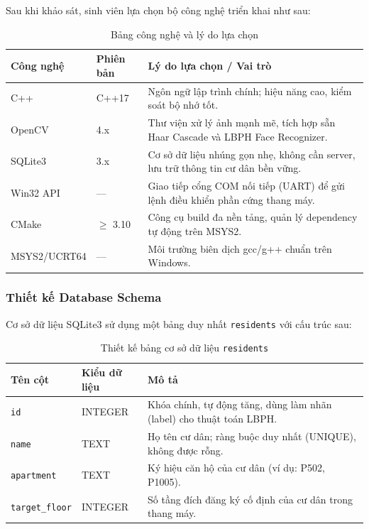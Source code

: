 \documentclass[12pt,a4paper]{article}
\begin{document}
Sau khi khảo sát, sinh viên lựa chọn bộ công nghệ triển khai như sau:

\begin{table}[h!]
\centering
\caption{Bảng công nghệ và lý do lựa chọn}
\renewcommand{\arraystretch}{1.3}
\begin{tabular}{|m{3cm}|m{4cm}|m{7.5cm}|}
\hline
\textbf{Công nghệ} & \textbf{Phiên bản} & \textbf{Lý do lựa chọn / Vai trò} \\ \hline
C++ & C++17 & Ngôn ngữ lập trình chính; hiệu năng cao, kiểm soát bộ nhớ tốt. \\ \hline
OpenCV & 4.x & Thư viện xử lý ảnh mạnh mẽ, tích hợp sẵn Haar Cascade và LBPH Face Recognizer. \\ \hline
SQLite3 & 3.x & Cơ sở dữ liệu nhúng gọn nhẹ, không cần server, lưu trữ thông tin cư dân bền vững. \\ \hline
Win32 API & --- & Giao tiếp cổng COM nối tiếp (UART) để gửi lệnh điều khiển phần cứng thang máy. \\ \hline
CMake & $\geq$ 3.10 & Công cụ build đa nền tảng, quản lý dependency tự động trên MSYS2. \\ \hline
MSYS2/UCRT64 & --- & Môi trường biên dịch gcc/g++ chuẩn trên Windows. \\ \hline
\end{tabular}
\end{table}

\subsubsection{Thiết kế Database Schema}

Cơ sở dữ liệu SQLite3 sử dụng một bảng duy nhất \texttt{residents} với cấu trúc sau:

\begin{table}[h!]
\centering
\caption{Thiết kế bảng cơ sở dữ liệu \texttt{residents}}
\renewcommand{\arraystretch}{1.3}
\begin{tabular}{|m{3.5cm}|m{3cm}|m{8cm}|}
\hline
\textbf{Tên cột} & \textbf{Kiểu dữ liệu} & \textbf{Mô tả} \\ \hline
\texttt{id} & INTEGER & Khóa chính, tự động tăng, dùng làm nhãn (label) cho thuật toán LBPH. \\ \hline
\texttt{name} & TEXT & Họ tên cư dân; ràng buộc duy nhất (UNIQUE), không được rỗng. \\ \hline
\texttt{apartment} & TEXT & Ký hiệu căn hộ của cư dân (ví dụ: P502, P1005). \\ \hline
\texttt{target\_floor} & INTEGER & Số tầng đích đăng ký cố định của cư dân trong thang máy. \\ \hline
\end{tabular}
\end{table}
\end{document}
